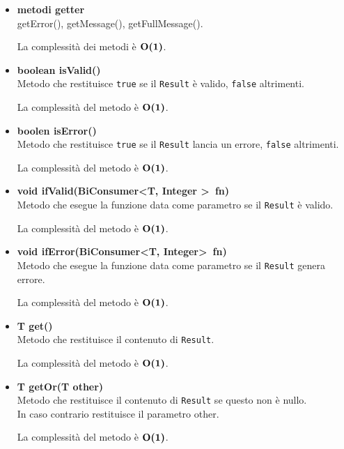 \documentclass[a4paper, 12pt]{scrreprt}
\begin{document}
				\begin{itemize}
					\item \textbf{metodi getter}
					\\getError(), getMessage(), getFullMessage().
					
					La complessit\`a dei metodi \`e $\mathbf{O}\textbf{(1)}$.
					
					\item\textbf{boolean isValid()}
					\\Metodo che restituisce \verb!true! se il \verb!Result! \`e valido, \verb!false! altrimenti.
					
					La complessit\`a del metodo \`e $\mathbf{O}\textbf{(1)}$.
					
					\item\textbf{boolen isError()}
					\\Metodo che restituisce \verb!true! se il \verb!Result! lancia un errore, \verb!false! altrimenti.
					
					La complessit\`a del metodo \`e $\mathbf{O}\textbf{(1)}$.
	
					\item\textbf{void ifValid(BiConsumer\textless T, Integer \textgreater~fn)}
					\\Metodo che esegue la funzione data come parametro se il \verb!Result! \`e valido.
					
					La complessit\`a del metodo \`e $\mathbf{O}\textbf{(1)}$.
	
					\item\textbf{void ifError(BiConsumer\textless T, Integer\textgreater~fn)}
					\\Metodo che esegue la funzione data come parametro se il \verb!Result! genera errore.
					
					La complessit\`a del metodo \`e $\mathbf{O}\textbf{(1)}$.
	
					\item \textbf{T get()}
					\\Metodo che restituisce il contenuto di \verb!Result!.
					
					La complessit\`a del metodo \`e $\mathbf{O}\textbf{(1)}$.
	
					\item \textbf{T getOr(T other)}
					\\Metodo che restituisce il contenuto di \verb!Result! se questo non \`e nullo.
					\\ In caso contrario restituisce il parametro other.
					
					La complessit\`a del metodo \`e $\mathbf{O}\textbf{(1)}$.
	

\end{itemize}
\end{document}
